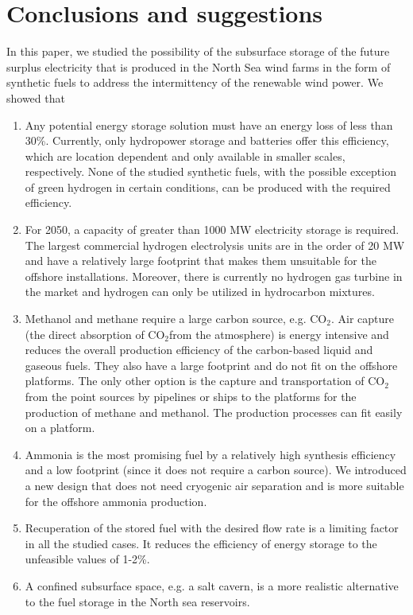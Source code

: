 \documentclass{ECOS_2021}
\begin{document}
\sffamily \section{Conclusions and suggestions}
\normalsize
In this paper, we studied the possibility of the subsurface storage
of the future surplus electricity that is produced in the North Sea
wind farms in the form of synthetic fuels to address the intermittency of the renewable
wind power. We showed that 
\begin{enumerate}
\item Any potential energy storage solution must have an energy loss of
less than 30\%. Currently, only hydropower storage and batteries offer
this efficiency, which are location dependent and only available in
smaller scales, respectively. None of the studied synthetic fuels,
with the possible exception of green hydrogen in certain conditions,
can be produced with the required efficiency.
\item For 2050, a capacity of greater than 1000 MW electricity storage is
required. The largest commercial hydrogen electrolysis units are in
the order of 20 MW and have a relatively large footprint that makes
them unsuitable for the offshore installations. Moreover, there is
currently no hydrogen gas turbine in the market and hydrogen can only
be utilized in hydrocarbon mixtures. 
\item Methanol and methane require a large carbon source, e.g. CO$_{2}$.
Air capture (the direct absorption of CO$_{2}$from the atmosphere)
is energy intensive and reduces the overall production efficiency
of the carbon-based liquid and gaseous fuels. They also have a large
footprint and do not fit on the offshore platforms. The only other
option is the capture and transportation of CO$_{2}$ from the point
sources by pipelines or ships to the platforms for the production
of methane and methanol. The production processes can fit easily on
a platform. 
\item Ammonia is the most promising fuel by a relatively high synthesis
efficiency and a low footprint (since it does not require a carbon
source). We introduced a new design that does not need cryogenic air
separation and is more suitable for the offshore ammonia production. 
\item Recuperation of the stored fuel with the desired flow rate is a limiting
factor in all the studied cases. It reduces the efficiency of energy
storage to the unfeasible values of 1-2\%. 
\item A confined subsurface space, e.g. a salt cavern, is a more realistic
alternative to the fuel storage in the North sea reservoirs.
\end{enumerate}
\end{document}
